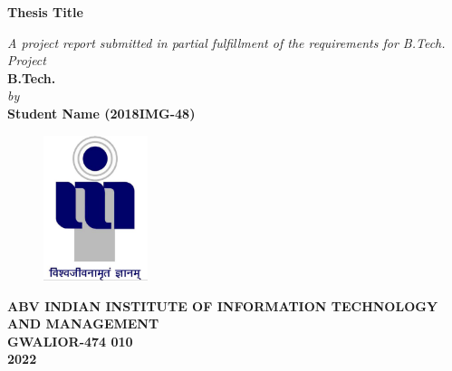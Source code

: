 \title{}
\author{}
\thispagestyle{empty}

\begin{titlepage}
\begin{center}
{\LARGE \bf Thesis Title} \\
\end{center}
\begin{center}
\vspace{0.6in}
{\large \it A project report submitted in partial fulfillment of the requirements for B.Tech. Project} \\
\vspace{0.6in}
{\large \bf B.Tech.} \\
\vspace{0.5in}
{\large \it by\\}
\vspace{0.3in}
{\large \bf Student Name (2018IMG-48)}\\
\end {center}
\vspace{0.8in}
\begin{figure}[h]
\centerline{\includegraphics[width=1.2in]{iiitm}}
\end{figure}
\begin{center}
{\Large \bf ABV INDIAN INSTITUTE OF INFORMATION TECHNOLOGY AND MANAGEMENT\\
GWALIOR-474 010\\}
\vspace{0.2in}
{\Large \bf 2022\\}
\end{center}
\end{titlepage}
